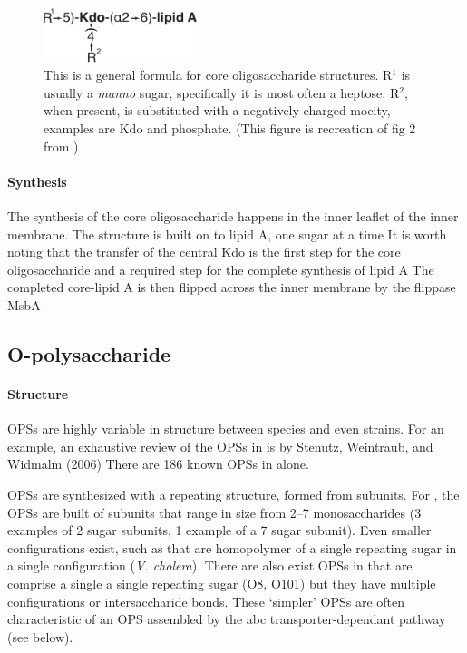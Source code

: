 \begin{figure}[htb]
  	\begin{center}
   		\includegraphics[width=0.4\textwidth]{intro/img/coreformula.pdf}
   	\end{center}
   	\caption[A generalized formula for core oligosaccharides]{This is a general formula for core oligosaccharide structures. R$^1$ is usually a \textit{manno} sugar, specifically it is most often a heptose. R$^2$, when present, is substituted with a negatively charged moeity, examples are Kdo and phosphate. (This figure is recreation of fig 2 from )
}
\label{fig:coreformula}
\end{figure}   

    \paragraph{Synthesis}
 The synthesis of the core oligosaccharide happens in the inner leaflet of the inner membrane. The structure is built on to lipid A, one sugar at a time It is worth noting that the transfer of the central Kdo is the first step for the core oligosaccharide and a required step for the complete synthesis of lipid A The completed core-lipid A is then flipped across the inner membrane by the flippase MsbA

  \subsection{O-polysaccharide}\label{sec:o-polysaccharide}

    \paragraph{Structure}
    \Acp{OPS} are highly variable in structure between species and even strains. For an example, an exhaustive review of the \acp{OPS} in \ecoli is by Stenutz, Weintraub, and Widmalm (2006) There are 186 known \acp{OPS} in \ecoli alone. 

\Acp{OPS} are synthesized with a repeating structure, formed from subunits. For \ecoli, the \acp{OPS} are built of subunits that range in size from 2--7 monosaccharides (3 examples of 2 sugar subunits, 1 example of a 7 sugar subunit).  Even smaller configurations exist, such as that are homopolymer of a single repeating sugar in a single configuration (\eg \textit{V. cholera}). There are also exist \acp{OPS} in \ecoli that are comprise a single a single repeating sugar (O8, O101) but they have multiple configurations or intersaccharide bonds. These `simpler' \acp{OPS} are often characteristic of an \ac{OPS} assembled by the \ac{abc} transporter-dependant pathway (see below). 
 
